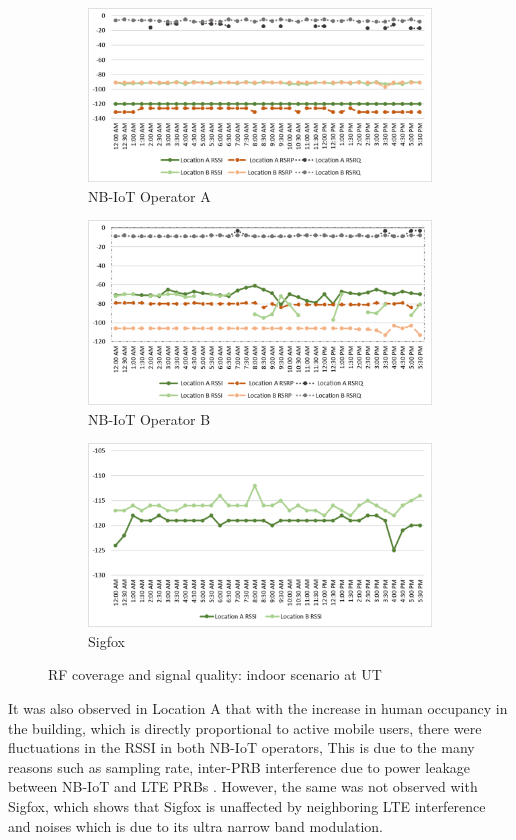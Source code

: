 \documentclass[12pt]{article}
\begin{document}
 \begin{figure}[h!]
\begin{subfigure}[t]{\linewidth}
  \centering
  \includegraphics[width=.5\linewidth]{Images/tartu/ATartuIndoor.pdf}  
  \caption{NB-IoT Operator A}
\end{subfigure}
\begin{subfigure}[t]{\linewidth}
  \centering
  \includegraphics[width=.5\linewidth]{Images/tartu/BTartuIndoor.pdf}  
  \caption{NB-IoT Operator B}
  
\end{subfigure}
\begin{subfigure}[t]{\linewidth}
  \centering
  \includegraphics[width=.5\linewidth]{Images/tartu/STartuIndoor.pdf}  
\caption{Sigfox}
 \end{subfigure}
\caption{RF coverage and signal quality: indoor scenario at UT}
 \label{RFIndoor Tartu}
\end{figure}

It was also observed in Location A that with the increase in human occupancy in the building, which is directly proportional to active mobile users, there were fluctuations in the RSSI in both NB-IoT operators, This is due to the many reasons such as sampling rate, inter-PRB interference due to power leakage between NB-IoT and LTE PRBs \cite{mwakwata2019narrowband}. However, the same was not observed with Sigfox, which shows that Sigfox is unaffected by neighboring LTE interference and noises which is due to its ultra narrow band modulation.
\end{document}
